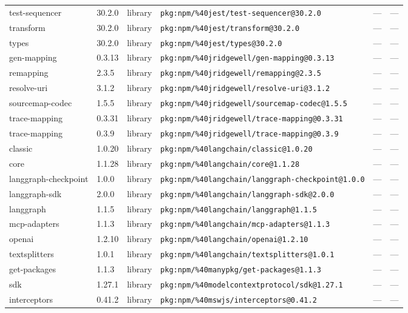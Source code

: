 \documentclass[11pt]{article}
\begin{document}
\begin{longtable}{|l|l|l|p{2.2cm}|l|p{4cm}|}
test-sequencer & 30.2.0 & library & \texttt{pkg:npm/\%40jest/test-sequencer@30.2.0} & — & — \\
transform & 30.2.0 & library & \texttt{pkg:npm/\%40jest/transform@30.2.0} & — & — \\
types & 30.2.0 & library & \texttt{pkg:npm/\%40jest/types@30.2.0} & — & — \\
gen-mapping & 0.3.13 & library & \texttt{pkg:npm/\%40jridgewell/gen-mapping@0.3.13} & — & — \\
remapping & 2.3.5 & library & \texttt{pkg:npm/\%40jridgewell/remapping@2.3.5} & — & — \\
resolve-uri & 3.1.2 & library & \texttt{pkg:npm/\%40jridgewell/resolve-uri@3.1.2} & — & — \\
sourcemap-codec & 1.5.5 & library & \texttt{pkg:npm/\%40jridgewell/sourcemap-codec@1.5.5} & — & — \\
trace-mapping & 0.3.31 & library & \texttt{pkg:npm/\%40jridgewell/trace-mapping@0.3.31} & — & — \\
trace-mapping & 0.3.9 & library & \texttt{pkg:npm/\%40jridgewell/trace-mapping@0.3.9} & — & — \\
classic & 1.0.20 & library & \texttt{pkg:npm/\%40langchain/classic@1.0.20} & — & — \\
core & 1.1.28 & library & \texttt{pkg:npm/\%40langchain/core@1.1.28} & — & — \\
langgraph-checkpoint & 1.0.0 & library & \texttt{pkg:npm/\%40langchain/langgraph-checkpoint@1.0.0} & — & — \\
langgraph-sdk & 2.0.0 & library & \texttt{pkg:npm/\%40langchain/langgraph-sdk@2.0.0} & — & — \\
langgraph & 1.1.5 & library & \texttt{pkg:npm/\%40langchain/langgraph@1.1.5} & — & — \\
mcp-adapters & 1.1.3 & library & \texttt{pkg:npm/\%40langchain/mcp-adapters@1.1.3} & — & — \\
openai & 1.2.10 & library & \texttt{pkg:npm/\%40langchain/openai@1.2.10} & — & — \\
textsplitters & 1.0.1 & library & \texttt{pkg:npm/\%40langchain/textsplitters@1.0.1} & — & — \\
get-packages & 1.1.3 & library & \texttt{pkg:npm/\%40manypkg/get-packages@1.1.3} & — & — \\
sdk & 1.27.1 & library & \texttt{pkg:npm/\%40modelcontextprotocol/sdk@1.27.1} & — & — \\
interceptors & 0.41.2 & library & \texttt{pkg:npm/\%40mswjs/interceptors@0.41.2} & — & — \\

\end{longtable}
\end{document}
